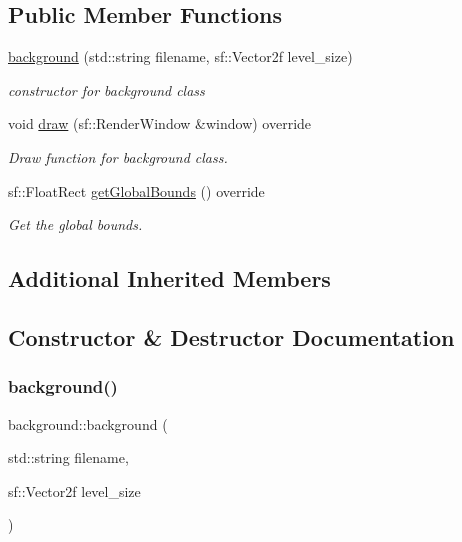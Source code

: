 \subsection*{Public Member Functions}
\begin{DoxyCompactItemize}
\item 
\hyperlink{classbackground_ad199eead2ef4a4d867f2542d3a152471}{background} (std\+::string filename, sf\+::\+Vector2f level\+\_\+size)
\begin{DoxyCompactList}\small\item\em constructor for background class \end{DoxyCompactList}\item 
void \hyperlink{classbackground_a41736f9a00defad1e84b3a8099c887e2}{draw} (sf\+::\+Render\+Window \&window) override
\begin{DoxyCompactList}\small\item\em Draw function for background class. \end{DoxyCompactList}\item 
sf\+::\+Float\+Rect \hyperlink{classbackground_ab5f2b627cd58e0d07678f0af01c6bd2d}{get\+Global\+Bounds} () override
\begin{DoxyCompactList}\small\item\em Get the global bounds. \end{DoxyCompactList}\end{DoxyCompactItemize}
\subsection*{Additional Inherited Members}


\subsection{Constructor \& Destructor Documentation}
\mbox{\label{classbackground_ad199eead2ef4a4d867f2542d3a152471}} 
\subsubsection{\texorpdfstring{background()}{background()}}
{\footnotesize\ttfamily background\+::background (\begin{DoxyParamCaption}\item[{std\+::string}]{filename,  }\item[{sf\+::\+Vector2f}]{level\+\_\+size }\end{DoxyParamCaption})}



